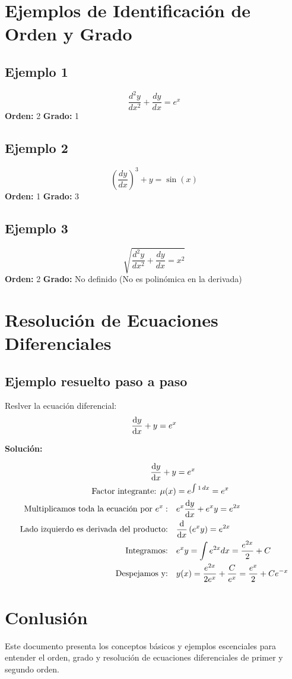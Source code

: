 \documentclass[a4paper, 12pt]{article}
\newcommand{\orden}[1]{\textbf{Orden:} #1}
\newcommand{\grado}[1]{\textbf{Grado:} #1}
\newcommand{\solucion}{\textbf{Solución:} }
\begin{document}
  \section{Ejemplos de Identificación de Orden y Grado}
  \subsection{Ejemplo 1}
  \[
  \frac{d^2y}{dx^2} + \frac{dy}{dx} = e^x
  \]
  \orden{2} \quad \grado{1}

  \subsection{Ejemplo 2}
  \[ 
  \left( \frac{dy}{dx} \right)^3 + y = \sin(x)
  \]
  \orden{1} \quad \grado{3}

  \subsection{Ejemplo 3}
  \[ 
  \sqrt{\frac{d^2y}{dx^2} + \frac{dy}{dx} = x^2}
  \]
  \orden{2} \quad \grado{No definido} (No es polinómica en la derivada)

  \section{Resolución de Ecuaciones Diferenciales}
  \subsection{Ejemplo resuelto paso a paso}
  
  \ejemplo Reslver la ecuación diferencial:
  \[ 
  \dv{y}{x} + y = e^x
  \]

  \solucion

  \begin{align*}
    \dv{y}{x} + y &= e^x \\
    \text{Factor integrante: } \mu(x) &= e^{\int 1 \, dx} = e^{x} \\
    \text{Multiplicamos toda la ecuación por } e^x: \quad & e^x \dv{y}{x} + e^x y = e^{2x} \\
    \text{Lado izquierdo es derivada del producto:} \quad & \dv{}{x} \left( e^x y \right) = e^{2x} \\
    \text{Integramos:} \quad & e^x y = \int e^{2x} dx = \frac{e^{2x}}{2} + C \\
    \text{Despejamos y:} \quad & y(x) = \frac{e^{2x}}{2e^x} + \frac{C}{e^x} = \frac{e^{x}}{2} + C e^{-x}
  \end{align*}

  \newpage

  \section{Conlusión}
  Este documento presenta los conceptos básicos y ejemplos escenciales para entender el orden, grado
  y resolución de ecuaciones diferenciales de primer y segundo orden.
\end{document}
